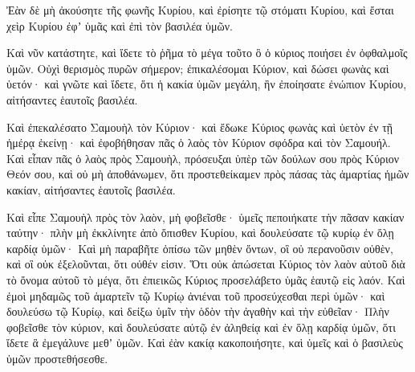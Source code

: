 {Ἐὰν δὲ μὴ ἀκούσητε τῆς φωνῆς Κυρίου, καὶ ἐρίσητε τῷ στόματι Κυρίου, καὶ ἔσται χεὶρ Κυρίου ἐφʼ ὑμᾶς καὶ ἐπὶ τὸν βασιλέα ὑμῶν.
\par }{\PP {}Καὶ νῦν κατάστητε, καὶ ἴδετε τὸ ῥῆμα τὸ μέγα τοῦτο ὃ ὁ κύριος ποιήσει ἐν ὀφθαλμοῖς ὑμῶν.
Οὐχὶ θερισμὸς πυρῶν σήμερον; ἐπικαλέσομαι Κύριον, καὶ δώσει φωνὰς καὶ ὑετόν· καὶ γνῶτε καὶ ἴδετε, ὅτι ἡ κακία ὑμῶν μεγάλη, ἣν ἐποίησατε ἐνώπιον Κυρίου, αἰτήσαντες ἑαυτοῖς βασιλέα.
\par }{\PP {}Καὶ ἐπεκαλέσατο Σαμουὴλ τὸν Κύριον· καὶ ἔδωκε Κύριος φωνὰς καὶ ὑετὸν ἐν τῇ ἡμέρᾳ ἐκείνῃ· καὶ ἐφοβήθησαν πᾶς ὁ λαὸς τὸν Κύριον σφόδρα καὶ τὸν Σαμουήλ.
Καὶ εἶπαν πᾶς ὁ λαὸς πρὸς Σαμουὴλ, πρόσευξαι ὑπὲρ τῶν δούλων σου πρὸς Κύριον Θεόν σου, καὶ οὐ μὴ ἀποθάνωμεν, ὅτι προστεθείκαμεν πρὸς πάσας τὰς ἁμαρτίας ἡμῶν κακίαν, αἰτήσαντες ἑαυτοῖς βασιλέα.
\par }{\PP {}Καὶ εἶπε Σαμουὴλ πρὸς τὸν λαὸν, μὴ φοβεῖσθε· ὑμεῖς πεποιήκατε τὴν πᾶσαν κακίαν ταύτην· πλὴν μὴ ἐκκλίνητε ἀπὸ ὄπισθεν Κυρίου, καὶ δουλεύσατε τῷ κυρίῳ ἐν ὅλῃ καρδίᾳ ὑμῶν·
Καὶ μὴ παραβῆτε ὀπίσω τῶν μηθὲν ὄντων, οἳ οὐ περανοῦσιν οὐθὲν, καὶ οἳ οὐκ ἐξελοῦνται, ὅτι οὐθέν εἰσιν.
Ὅτι οὐκ ἀπώσεται Κύριος τὸν λαὸν αὐτοῦ διὰ τὸ ὄνομα αὐτοῦ τὸ μέγα, ὅτι ἐπιεικῶς Κύριος προσελάβετο ὑμᾶς ἑαυτῷ εἰς λαόν.
Καὶ ἐμοὶ μηδαμῶς τοῦ ἁμαρτεῖν τῷ Κυρίῳ ἀνιέναι τοῦ προσεύχεσθαι περὶ ὑμῶν· καὶ δουλεύσω τῷ Κυρίῳ, καὶ δείξω ὑμῖν τὴν ὁδὸν τὴν ἀγαθὴν καὶ τὴν εὐθεῖαν·
Πλὴν φοβεῖσθε τὸν κύριον, καὶ δουλεύσατε αὐτῷ ἐν ἀληθείᾳ καὶ ἐν ὅλῃ καρδίᾳ ὑμῶν, ὅτι ἴδετε ἃ ἐμεγάλυνε μεθʼ ὑμῶν.
Καὶ ἐὰν κακίᾳ κακοποιήσητε, καὶ ὑμεῖς καὶ ὁ βασιλεὺς ὑμῶν προστεθήσεσθε.

}
